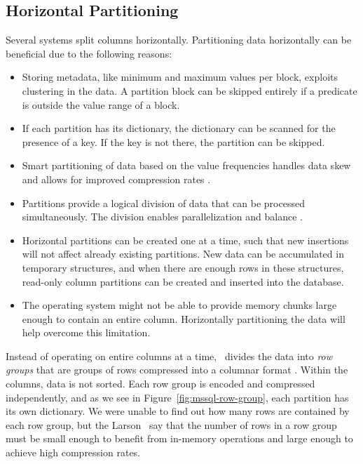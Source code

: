 \subsection{Horizontal Partitioning}
\label{sub:Horizontal Partitioning}
Several systems split columns horizontally. Partitioning data horizontally can be beneficial due to the following reasons:
\begin{itemize}
  \item Storing metadata, like minimum and maximum values per block, exploits clustering in the data. A partition block can be skipped entirely if a predicate is outside the value range of a block.
  \item If each partition has its dictionary, the dictionary can be scanned for the presence of a key. If the key is not there, the partition can be skipped.
  \item Smart partitioning of data based on the value frequencies handles data skew and allows for improved compression rates \cite{Raman2008-gi}. 
  \item Partitions provide a logical division of data that can be processed simultaneously. The division enables parallelization and balance \cite{Exasol2014-xh}.
  \item Horizontal partitions can be created one at a time, such that new insertions will not affect already existing partitions. New data can be accumulated in temporary structures, and when there are enough rows in these structures, read-only column partitions can be created and inserted into the database.
  \item The operating system might not be able to provide memory chunks large enough to contain an entire column. Horizontally partitioning the data will help overcome this limitation.
\end{itemize}


Instead of operating on entire columns at a time, \mssql~divides the data into \textit{row groups} that are groups of rows compressed into a columnar format \cite{Larson2013-mc}. Within the columns, data is not sorted. Each row group is encoded and compressed independently, and as we see in Figure~\ref{fig:mssql-row-group}, each partition has its own dictionary. We were unable to find out how many rows are contained by each row group, but the Larson \ea~say that the number of rows in a row group must be small enough to benefit from in-memory operations and large enough to achieve high compression rates. 

